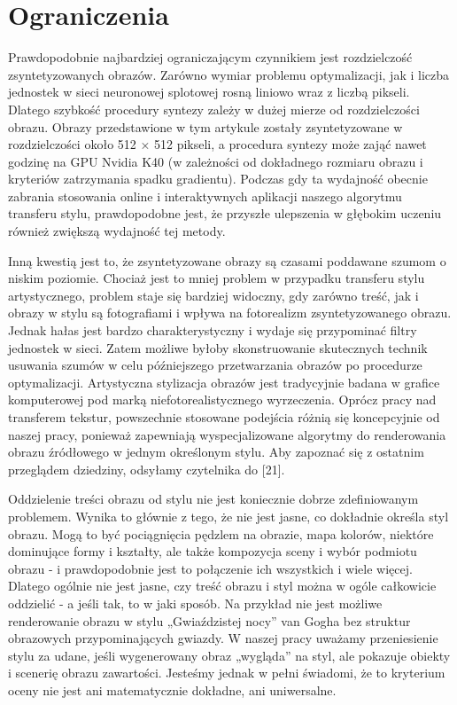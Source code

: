 \documentclass[brudnopis]{xmgr}
\begin{document}
\section{Ograniczenia\label{s:dsssl}}

Prawdopodobnie najbardziej ograniczającym czynnikiem jest rozdzielczość zsyntetyzowanych obrazów. Zarówno wymiar problemu optymalizacji, jak i liczba jednostek w sieci neuronowej splotowej rosną liniowo wraz z liczbą pikseli. Dlatego szybkość procedury syntezy zależy w dużej mierze od rozdzielczości obrazu. Obrazy przedstawione w tym artykule zostały zsyntetyzowane w rozdzielczości około 512 × 512 pikseli, a procedura syntezy może zająć nawet godzinę na GPU Nvidia K40 (w zależności od dokładnego rozmiaru obrazu i kryteriów zatrzymania spadku gradientu). Podczas gdy ta wydajność obecnie zabrania stosowania online i interaktywnych aplikacji naszego algorytmu transferu stylu, prawdopodobne jest, że przyszłe ulepszenia w głębokim uczeniu również zwiększą wydajność tej metody.

Inną kwestią jest to, że zsyntetyzowane obrazy są czasami poddawane szumom o niskim poziomie. Chociaż jest to mniej problem w przypadku transferu stylu artystycznego, problem staje się bardziej widoczny, gdy zarówno treść, jak i obrazy w stylu są fotografiami i wpływa na fotorealizm zsyntetyzowanego obrazu. Jednak hałas jest bardzo charakterystyczny i wydaje się przypominać filtry jednostek w sieci. Zatem możliwe byłoby skonstruowanie skutecznych technik usuwania szumów w celu późniejszego przetwarzania obrazów po procedurze optymalizacji.
Artystyczna stylizacja obrazów jest tradycyjnie badana w grafice komputerowej pod marką niefotorealistycznego wyrzeczenia. Oprócz pracy nad transferem tekstur, powszechnie stosowane podejścia różnią się koncepcyjnie od naszej pracy, ponieważ zapewniają wyspecjalizowane algorytmy do renderowania obrazu źródłowego w jednym określonym stylu. Aby zapoznać się z ostatnim przeglądem dziedziny, odsyłamy czytelnika do [21].

Oddzielenie treści obrazu od stylu nie jest koniecznie dobrze zdefiniowanym problemem. Wynika to głównie z tego, że nie jest jasne, co dokładnie określa styl obrazu. Mogą to być pociągnięcia pędzlem na obrazie, mapa kolorów, niektóre dominujące formy i kształty, ale także kompozycja sceny i wybór podmiotu obrazu - i prawdopodobnie jest to połączenie ich wszystkich i wiele więcej. Dlatego ogólnie nie jest jasne, czy treść obrazu i styl można w ogóle całkowicie oddzielić - a jeśli tak, to w jaki sposób. Na przykład nie jest możliwe renderowanie obrazu w stylu „Gwiaździstej nocy” van Gogha bez struktur obrazowych przypominających gwiazdy. W naszej pracy uważamy przeniesienie stylu za udane, jeśli wygenerowany obraz „wygląda” na styl, ale pokazuje obiekty i scenerię obrazu zawartości. Jesteśmy jednak w pełni świadomi, że to kryterium oceny nie jest ani matematycznie dokładne, ani uniwersalne.
\end{document}
